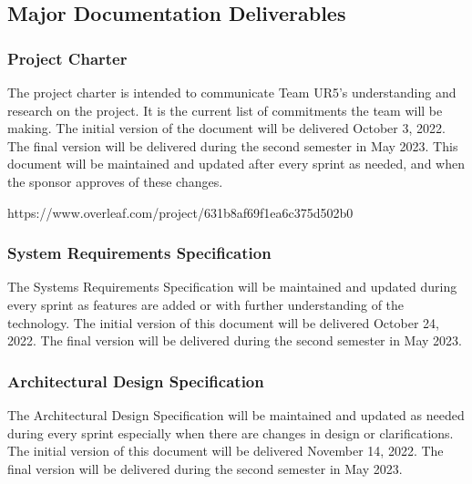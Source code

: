 
\subsection{Major Documentation Deliverables}
\subsubsection{Project Charter}
The project charter is intended to communicate Team UR5's understanding and research on the project. It is the current list of commitments the team will be making. The initial version of the document will be delivered October 3, 2022. The final version will be delivered during the second semester in May 2023. This document will be maintained and updated after every sprint as needed, and when the sponsor approves of these changes.

https://www.overleaf.com/project/631b8af69f1ea6c375d502b0
\subsubsection{System Requirements Specification}
The Systems Requirements Specification will be maintained and updated during every sprint as features are added or with further understanding of the technology. The initial version of this document will be delivered October 24, 2022. The final version will be delivered during the second semester in May 2023.


\subsubsection{Architectural Design Specification}
The Architectural Design Specification will be maintained and updated as needed during every sprint especially when there are changes in design or clarifications. The initial version of this document will be delivered November 14, 2022. The final version will be delivered during the second semester in May 2023.

